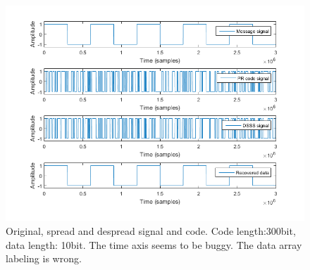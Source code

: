 \documentclass[12pt,a4paper]{article}
\begin{document}
	\begin{figure}
		\includegraphics[width=\textwidth]{images/code_cl300_dl10.png}
		\caption{Original, spread and despread signal and code. Code length:300bit, data length: 10bit. The time axis seems to be buggy. The data array labeling is wrong.}
		\label{300:10}
		

		
	\end{figure}
	



	
	

	
	
	
\end{document}
